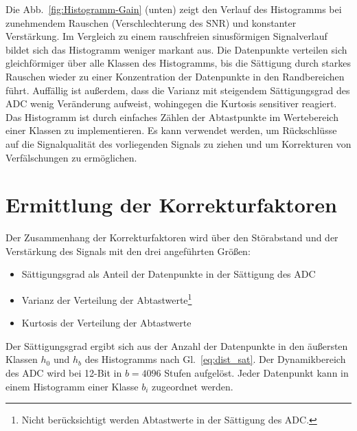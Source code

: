 Die Abb.~\ref{fig:Histogramm-Gain} (unten) zeigt den Verlauf des Histogramms bei zunehmendem Rauschen (Verschlechterung des SNR) und konstanter Verstärkung. Im Vergleich zu einem rauschfreien sinusförmigen Signalverlauf bildet sich das Histogramm weniger markant aus. Die Datenpunkte verteilen sich gleichförmiger über alle Klassen des Histogramms, bis die Sättigung durch starkes Rauschen wieder zu einer Konzentration der Datenpunkte in den Randbereichen führt. Auffällig ist außerdem, dass die Varianz mit steigendem Sättigungsgrad des ADC wenig Veränderung aufweist, wohingegen die Kurtosis sensitiver reagiert. Das Histogramm ist durch einfaches Zählen der Abtastpunkte im Wertebereich einer Klassen zu implementieren. Es kann verwendet werden, um Rückschlüsse auf die Signalqualität des vorliegenden Signals zu ziehen und um Korrekturen von Verfälschungen zu ermöglichen. 


\section{Ermittlung der Korrekturfaktoren}
Der Zusammenhang der Korrekturfaktoren wird über den Störabstand und der Verstärkung des Signals mit den drei angeführten Größen: 
\begin{itemize}
	\item Sättigungsgrad als Anteil der Datenpunkte in der Sättigung des ADC %
	\item Varianz der Verteilung der Abtastwerte\footnote[1]{Nicht berücksichtigt werden Abtastwerte in der Sättigung des ADC.\label{foot:bereinigt}}
	\item Kurtosis der Verteilung der Abtastwerte
\end{itemize}


Der Sättigungsgrad ergibt sich aus der Anzahl der Datenpunkte in den äußersten Klassen $h_0$ und $h_b$ des Histogramms nach Gl.~\eqref{eq:dist_sat}. Der Dynamikbereich des ADC wird bei 12-Bit in $b=4096$ Stufen aufgelöst. Jeder Datenpunkt kann in einem Histogramm einer Klasse $b_i$ zugeordnet werden.

